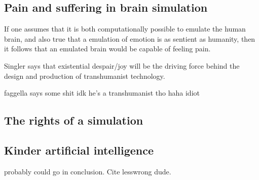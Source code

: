 
\subsection{Pain and suffering in brain simulation}

If one assumes that it is both computationally possible to emulate the human
brain, and also true that a emulation of emotion is as sentient as humanity,
then it follows that an emulated brain would be capable of feeling pain. 

Singler says that existential despair/joy will be the driving force behind the
design and production of transhumanist technology.

faggella says some shit idk he's a transhumanist tho haha idiot

\autocite{faggella_preventing_2019}
\autocite{singler_existential_2019}
 
\subsection{The rights of a simulation}

\subsection{Kinder artificial intelligence}
probably could go in conclusion. Cite lesswrong dude.

